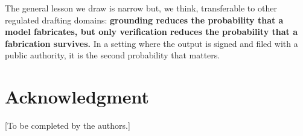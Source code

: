 \documentclass[conference]{IEEEtran}
\begin{document}
The general lesson we draw is narrow but, we think, transferable to other regulated drafting domains: \textbf{grounding reduces the probability that a model fabricates, but only verification reduces the probability that a fabrication survives.} In a setting where the output is signed and filed with a public authority, it is the second probability that matters.

\section*{Acknowledgment}

[To be completed by the authors.]

\end{document}
